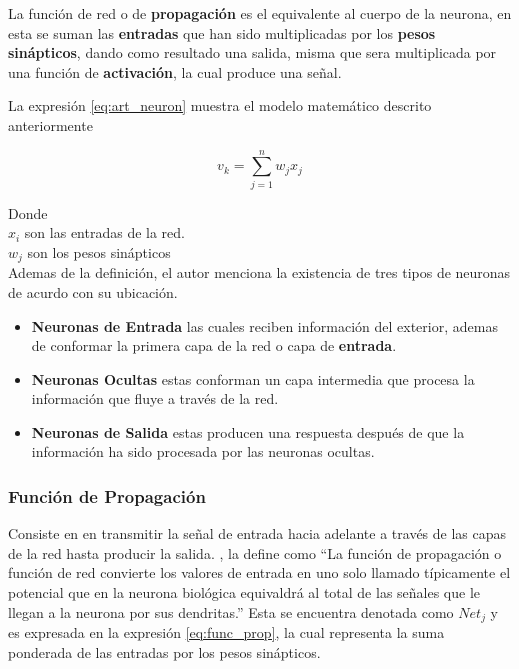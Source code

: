     La función de red o de \textbf{propagación} es el equivalente al cuerpo de la neurona, en esta se suman las \textbf{entradas} que han sido multiplicadas por los \textbf{pesos sinápticos}, dando como resultado una salida, misma que sera multiplicada por una función de \textbf{activación}, la cual produce una señal.

    La expresión \ref{eq:art_neuron} muestra el modelo matemático descrito anteriormente

    \begin{equation}
        v_k = \sum_{j = 1}^{n} w_j x_j
        \label{eq:art_neuron}
    \end{equation}
    
    Donde\\
    \noindent
    $x_i$ son las entradas de la red.\\
    $w_j$ son los pesos sinápticos\\
    
    Ademas de la definición, el autor menciona la existencia de tres tipos de neuronas de acurdo con su ubicación.

    \begin{itemize}
        \item \textbf{Neuronas de Entrada} las cuales reciben información del exterior, ademas de conformar la primera capa de la red o capa de \textbf{entrada}.
        \item \textbf{Neuronas Ocultas} estas conforman un capa intermedia que procesa la información que fluye a través de la red.
        \item \textbf{Neuronas de Salida} estas producen una respuesta después de que la información ha sido procesada por las neuronas ocultas.
    \end{itemize}

    \subsubsection{Función de Propagación}
    Consiste en en transmitir la señal de entrada hacia adelante a través de las capas de la red hasta producir la salida. \citet[p. 12]{bib13}, la define como ``La función de propagación o función de red convierte los valores de entrada en uno solo llamado típicamente el potencial que en la neurona biológica equivaldrá al total de las señales que le llegan a la neurona por sus dendritas.'' Esta se encuentra denotada como $Net_j$ y es expresada en la expresión \ref{eq:func_prop}, la cual representa la suma ponderada de las entradas por los pesos sinápticos.\\

